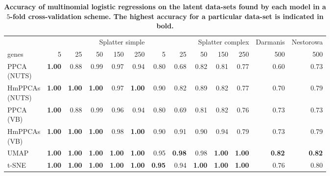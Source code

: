 \begin{table}
\setlength{\tabcolsep}{3pt}
\caption[Accuracy of multinomial logistic regressions on the latent data-sets found by each model in a $5$-fold cross-validation scheme.]{\textbf{Accuracy of multinomial logistic regressions on the latent data-sets found by each model in a $5$-fold cross-validation scheme. The highest accuracy for a particular data-set is indicated in bold.}}
    \label{tab:results}
    \centering
    \small
    \begin{tabular}{l|rrrrr|rrrrr|r|r}
          & \multicolumn{5}{r}{Splatter simple} & \multicolumn{5}{r}{Splatter complex} & Darmanis & Nestorowa \\
          genes & 5 & 25 & 50 & 150 & 250 & 5 & 25 & 50 & 150 & 250 & 500 & 500 \\
          \hline
        
        \makecell{PPCA\\(NUTS)} & \textbf{1.00} & 0.88 & 0.99 & 0.97 & 0.94 &
        0.80 & 0.68 & 0.82 & 0.81 & 0.77 & 0.60 & 0.73\\
        
        \makecell{HmPPCAs\\(NUTS)} & \textbf{1.00} & \textbf{1.00} & \textbf{1.00} & 0.97 & \textbf{1.00} &
        0.90 & 0.82 & 0.89 & 0.82 & 0.77 & 0.70 & 0.79\\
        
        \makecell{PPCA\\(VB)} & \textbf{1.00} & 0.88 & 0.99 & 0.96 & 0.94 &
        0.80 & 0.69 & 0.81 & 0.82 & 0.76 & 0.73 & 0.73\\
        
        \makecell{HmPPCAs\\(VB)} & \textbf{1.00} & \textbf{1.00} & \textbf{1.00} & 0.98 & \textbf{1.00} &
        0.90 & 0.91 & 0.90 & 0.94 & 0.79 & 0.73 & 0.79\\
        
        UMAP & \textbf{1.00} & \textbf{1.00} & \textbf{1.00} & \textbf{1.00} & \textbf{1.00} &
        0.95 & \textbf{0.98} & 0.98 & \textbf{1.00} & \textbf{1.00} & \textbf{0.82} & \textbf{0.82}\\
        
        t-SNE & \textbf{1.00} & \textbf{1.00} & \textbf{1.00} & \textbf{1.00} & \textbf{1.00} & 
        \textbf{0.95} & 0.94 & \textbf{1.00} & \textbf{1.00} & \textbf{1.00} & 0.76 & 0.80\\
    \end{tabular}
\end{table}




